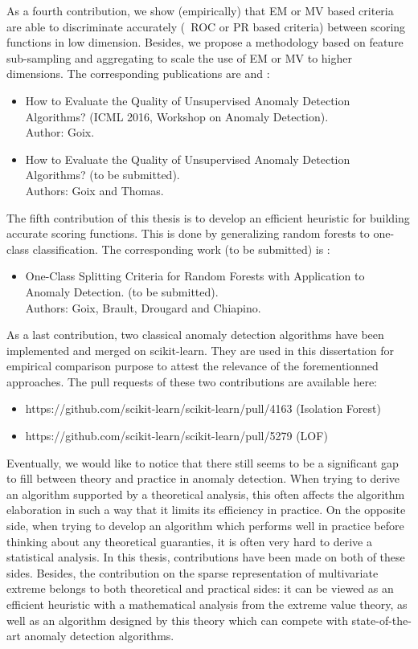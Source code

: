 As a fourth contribution, we show (empirically) that EM or MV based criteria are able to discriminate accurately (\wrt~ROC or PR based criteria) between scoring functions in low dimension. Besides, we propose a methodology based on feature sub-sampling and aggregating to scale the use of EM or MV to higher dimensions.
The corresponding publications are \cite{ICMLworkshop16} and \cite{NIPS16evaluation}:
\begin{itemize}
\item How to Evaluate the Quality of Unsupervised Anomaly Detection Algorithms? (ICML 2016, Workshop on Anomaly Detection). %
  \\
Author: Goix. 
\item How to Evaluate the Quality of Unsupervised Anomaly Detection Algorithms? (to be submitted).\\ Authors: Goix and Thomas. 
\end{itemize}


The fifth contribution of this thesis is to develop an efficient heuristic for building accurate scoring functions. This is done by generalizing random forests to one-class classification. The corresponding work (to be submitted) is \cite{OCRF16}: 
\begin{itemize}
\item One-Class Splitting Criteria for Random Forests with Application to Anomaly Detection. (to be submitted).\\
Authors: Goix, Brault, Drougard and Chiapino.
\end{itemize}



As a last contribution, two classical anomaly detection algorithms have been implemented and merged on scikit-learn. They are used in this dissertation for empirical comparison purpose to attest the relevance of the forementionned approaches.
The pull requests of these two contributions are available here:
\begin{itemize}
\item https://github.com/scikit-learn/scikit-learn/pull/4163  (Isolation Forest)
\item https://github.com/scikit-learn/scikit-learn/pull/5279 (LOF)
\end{itemize}


Eventually, we would like to notice that there still seems to be a significant gap to fill between theory and practice in anomaly detection. When trying to derive an algorithm supported by a theoretical analysis, this often affects the algorithm elaboration in such a way that it limits its efficiency in practice.
On the opposite side, when trying to develop an algorithm which performs well in practice before thinking about any theoretical guaranties, it is often very hard to derive a statistical analysis. In this thesis, contributions have been made on both of these sides. Besides, the contribution on the sparse representation of multivariate extreme belongs to both theoretical and practical sides: it can be viewed as an efficient heuristic with a mathematical analysis from the extreme value theory, as well as an algorithm designed by this theory which can compete with state-of-the-art anomaly detection algorithms.


